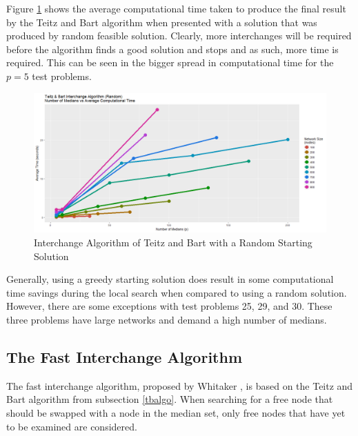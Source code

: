 \documentclass[11pt]{article}
\begin{document}
	Figure \ref{TBRand.median.time} shows the average computational time taken to produce the final result by the Teitz and Bart algorithm  when presented with a solution that was produced by random feasible solution.  Clearly, more interchanges will be required before the algorithm finds a good solution and stops and as such, more time is required.  This can be seen in the bigger spread in computational time for the $p=5$ test problems.

	\begin{figure}[H]
	\begin{center}
		\includegraphics[width=15cm]{TBRand.png}
		\caption{Interchange Algorithm of Teitz and Bart with a Random Starting Solution}
		\label{TBRand.median.time}
	\end{center}
	\end{figure}

	Generally, using a greedy starting solution does result in some computational time savings during the local search when compared to using a random solution.  However, there are some exceptions with test problems 25, 29, and 30.  These three problems have large networks and demand a high number of medians.
	
	\subsection{The Fast Interchange Algorithm} \label{fastintalgo}
	The fast interchange algorithm, proposed by Whitaker \cite{WHIT83}, is based on the Teitz and Bart algorithm  from subsection \ref{tbalgo}.  When searching for a free node that should be swapped with a node in the median set, only free nodes that have yet to be examined are considered.
	
\end{document}
